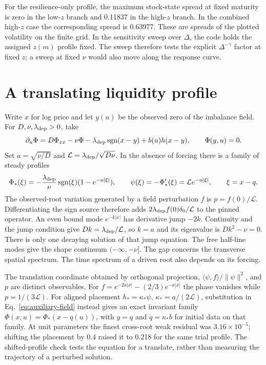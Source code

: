 \documentclass[11pt]{article}
\newcommand{\Liq}{\mathcal L}
\begin{document}
For the resilience-only profile, the maximum stock-state spread at fixed
maturity is zero in the low-\(z\) branch and 0.11837 in the high-\(z\)
branch. In the combined high-\(z\) case the corresponding spread is
0.63977. These are spreads of the plotted volatility on the finite grid.
In the sensitivity sweep over \(\Delta\), the code holds the assigned
\(z(m)\) profile fixed. The sweep therefore tests the explicit
\(\Delta^{-\gamma}\) factor at fixed \(z\); a sweep at fixed \(\nu\)
would also move along the response curve.

\section{A translating liquidity profile}
Write \(x\) for log price and let \(y(u)\) be the observed zero of the
imbalance field. For \(D,\nu,\lambda_{\rm dep}>0\), take
\begin{equation}
 \partial_u\Phi=D\Phi_{xx}-\nu\Phi-
 \lambda_{\rm dep}\operatorname{sgn}(x-y)+b(u)h(x-y),\qquad \Phi(y,u)=0 .
 \label{eq:auxiliary-field}
\end{equation}
Set \(a=\sqrt{\nu/D}\) and \(\Liq=\lambda_{\rm dep}/\sqrt{D\nu}\).
In the absence of forcing there is a family of steady profiles
\[
 \Phi_*(\xi)=-\frac{\lambda_{\rm dep}}{\nu}\operatorname{sgn}(\xi)
       (1-e^{-a|\xi|}),\qquad
 \psi(\xi)=-\Phi_*'(\xi)=\Liq e^{-a|\xi|},\qquad \xi=x-q .
\]
The observed-root variation generated by a field perturbation \(f\) is
\(p=f(0)/\Liq\). Differentiating the sign source therefore adds
\(2\lambda_{\rm dep}f(0)\delta_0/\Liq\) to the pinned operator.
An even bound mode \(e^{-k|x|}\) has derivative jump \(-2k\).
Continuity and the jump condition give \(Dk=\lambda_{\rm dep}/\Liq\),
so \(k=a\) and its eigenvalue is \(Dk^2-\nu=0\). There is only one
decaying solution of that jump equation. The free half-line modes give
the shape continuum \(( -\infty,-\nu]\). The gap concerns the transverse
spatial spectrum. The time spectrum of a driven root also depends on its forcing.

The translation coordinate obtained by orthogonal projection, \(\langle\psi,f\rangle/\|\psi\|^2\), and \(p\) are
distinct observables. For \(f=e^{-2a|x|}-(2/3)e^{-a|x|}\) the phase
vanishes while \(p=1/(3\Liq)\). For aligned placement
\(h_*=\kappa_*\psi\), \(\kappa_*=a/(2\Liq)\), substitution in
Eq.~\eqref{eq:auxiliary-field} instead gives an exact invariant family
\(\Phi(x,u)=\Phi_*(x-q(u))\), with \(y=q\) and \(\dot q=\kappa_* b\)
for initial data on that family. At unit parameters the finest cross-root
weak residual was \(3.16\times10^{-5}\); shifting the placement by 0.4
raised it to 0.218 for the same trial profile. The shifted-profile check
tests the equation for a translate, rather than measuring the trajectory
of a perturbed solution.
\end{document}
